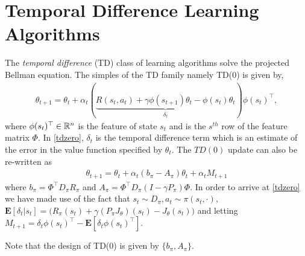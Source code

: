 \section{Temporal Difference Learning Algorithms}
The \emph{temporal difference} (TD) class of learning algorithms solve the projected Bellman equation. The simples of the TD family namely TD($0$) is given by,
\begin{align}\label{tdzero}
\theta_{t+1}=\theta_t+\alpha_t(\underbrace{R(s_t,a_t)+\gamma \phi(s_{t+1})\theta_t-\phi(s_t)\theta_t}_{{\delta_t}}){\phi(s_t)}^\top,
\end{align}
where $\phi(s_t)^\top \in \mathbb{R}^n$ is the feature of state $s_t$ and is the $s^{th}$ row of the feature matrix $\Phi$. In \eqref{tdzero}, $\delta_t$ is the temporal difference term which is an estimate of the error in the value function specified by $\theta_t$. The $TD(0)$ update can also be re-written as
\begin{align}\label{tdzero}
\theta_{t+1}=\theta_t+\alpha_t(b_\pi-A_\pi)\theta_t+\alpha_t M_{t+1}
\end{align}
where $b_\pi=\Phi^\top D_\pi R_\pi$ and $A_\pi=\Phi^\top D_\pi (I-\gamma P_\pi)\Phi$. In order to arrive at \eqref{tdzero} we have made use of the fact that $s_t\sim D_\pi, a_t\sim\pi(s_t,\cdot)$, $\mathbf{E}[\delta_t|s_t]= \big(R_\pi(s_t)+\gamma (P_\pi J_\theta)(s_t) -J_\theta(s_t)\big)$ and letting $M_{t+1}=\delta_t\phi(s_t)^\top-\mathbf{E}[\delta_t{\phi(s_t)}^\top]$.\par
Note that the design of TD($0$) is given by $\{b_\pi,A_\pi\}$.
